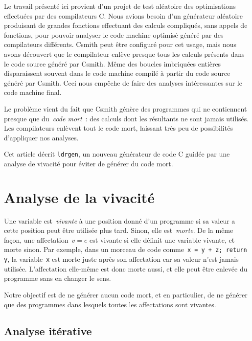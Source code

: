 \documentclass[a4paper]{easychair}
\newcommand\ldrgen{\texttt{ldrgen}}
\begin{document}
Le travail présenté ici provient d'un projet de test aléatoire des optimisations effectuées par des compilateurs C.
Nous avions besoin d'un générateur aléatoire produisant de grandes fonctions effectuant des calculs compliqués, sans appels
de fonctions, pour pouvoir analyser le code machine optimisé généré par des
compilateurs différents. Csmith peut être configuré pour cet usage, mais
nous avons découvert que le compilateur enlève presque tous les calculs
présents dans le code source généré par Csmith. Même des boucles imbriquées entières
disparaissent souvent dans le code machine compilé à partir du code source
généré par Csmith. Ceci nous empêche de faire des analyses intéressantes sur
le code machine final.

Le problème vient du fait que Csmith génère des programmes qui ne contiennent
presque que du~\emph{code mort}~: des calculs dont les résultants ne sont
jamais utilisés. Les compilateurs enlèvent tout le code mort, laissant très
peu de possibilités d'appliquer nos analyses.

Cet article décrit \ldrgen, un nouveau générateur de code C guidée par une
analyse de vivacité pour éviter de générer du code mort.


\section{Analyse de la vivacité}

Une variable est~\emph{vivante} à une position donné d'un programme si sa valeur a
cette position peut être utilisée plus tard.
Sinon, elle est~\emph{morte}. De la
même façon, une affectation~\(v = e\) est vivante si elle définit une
variable vivante, et morte sinon. Par exemple, dans un morceau de code
comme~\texttt{x = y + z; return y}, la variable~\texttt{x} est morte juste
après son affectation car sa valeur n'est jamais utilisée. L'affectation
elle-même est donc morte aussi, et elle peut être enlevée du programme sans
en changer le sens.

Notre objectif est de ne générer aucun code mort, et en particulier, de ne
générer que des programmes dans lesquels toutes les affectations sont
vivantes.

\subsection{Analyse itérative}
\end{document}
